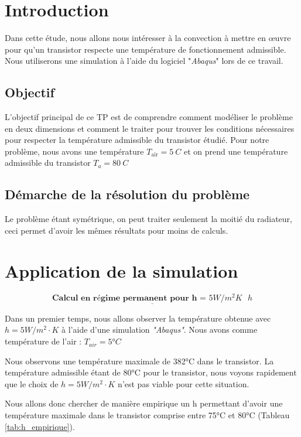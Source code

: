 \documentclass[11pt,a4paper]{article}
\begin{document}
\tableofcontents

\newpage

\section{Introduction}


Dans cette étude, nous allons nous intéresser à la convection à mettre en œuvre pour qu'un transistor respecte une température de fonctionnement admissible. Nous utiliserons une simulation à l'aide du logiciel "\textit{Abaqus}" lors de ce travail.

\subsection{Objectif}

L'objectif principal de ce TP est de comprendre comment modéliser le problème en deux dimensions et comment le traiter pour trouver les conditions nécessaires pour respecter la température admissible du transistor étudié. Pour notre problème, nous avons une température $T_{\text{air}} = \SI{5}{ C}$ et on prend une température admissible du transistor $T_a = \SI{80}{C}$

\subsection{Démarche de la résolution du problème}

Le problème étant symétrique, on peut traiter seulement la moitié du radiateur, ceci permet d'avoir les mêmes résultats pour moins de calculs.


\section{Application de la simulation}


\[
\underline{\textbf{Calcul en régime permanent pour h = $5W/m^2K$ \(h\)}}
\]


Dans un premier temps, nous allons observer la température obtenue avec $h = 5W/m^2\cdot K$  à l'aide d'une simulation \textit{"Abaqus"}. Nous avons comme température de l'air : $T_{air} = 5°C $

Nous observons une température maximale de 382°C dans le transistor. La température admissible étant de 80°C pour le transistor, nous voyons rapidement que le choix de $h = 5W/m^2\cdot K$ n'est pas viable pour cette situation.

Nous allons donc chercher de manière empirique un h permettant d'avoir une température maximale dans le transistor comprise entre 75°C et 80°C (Tableau \ref{tab:h_empirique}).
\end{document}
